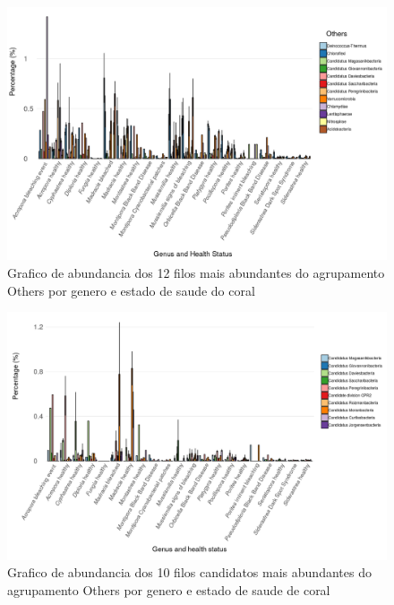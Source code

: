 \documentclass[12pt, a4paper]{report}
\begin{document}
\begin{figure}[H]
	\centering
	\includegraphics[scale=0.4]{figures/barplot_coral_genus&health_status_12_others_1_fevereiro_2019_edited.png}
	\caption{Grafico de abundancia dos 12 filos mais abundantes do agrupamento Others por genero e estado de saude do coral}
	\label{fig: barplotcoralgenus&health12mostabundantofothers1fevereiro2019}
\end{figure}

\begin{figure}[H]
	\centering
	\includegraphics[scale=0.4]{figures/barplot_coral_genus&health_status_10_most_abundant_candidate_1_fevereiro_2019_edited.png}
	\caption{Grafico de abundancia dos 10 filos candidatos mais abundantes do agrupamento Others por genero e estado de saude de coral}
	\label{fig: barplotcoralgenus&health10candidate1fevereiro2019}
\end{figure}
\end{document}
